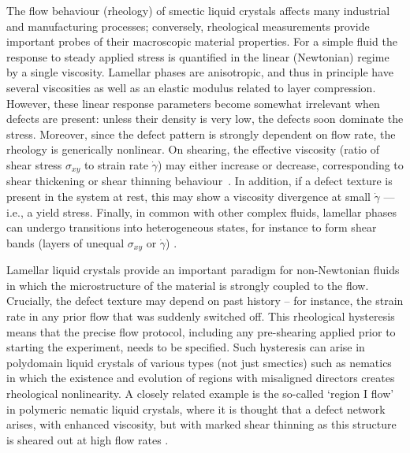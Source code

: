 \documentclass[8.5pt,twoside,twocolumn]{article}
\begin{document}
The flow behaviour (rheology) of smectic liquid crystals affects many industrial and manufacturing processes; conversely, rheological measurements provide important probes of their macroscopic material properties.
For a simple fluid the response to steady applied stress is quantified in the linear (Newtonian) regime by a single viscosity. Lamellar phases are anisotropic, and thus in principle have several viscosities as well as an elastic modulus related to layer compression. However, these linear response parameters become somewhat irrelevant when defects are present: unless their density is very low, the defects soon dominate the stress. Moreover, since the defect pattern is strongly dependent on flow rate, the rheology is generically nonlinear. On shearing, the effective viscosity (ratio of shear stress $\sigma_{xy}$  to strain rate $\dot\gamma$) may either increase or decrease, corresponding
to shear thickening or shear thinning behaviour~\cite{Larson}. In addition, if a defect texture is present in the system at rest, this may show a viscosity divergence at small $\dot \gamma$ --- i.e., a yield stress.
Finally, in common with other complex fluids, lamellar phases can undergo transitions into heterogeneous states, for instance to form shear bands (layers of unequal $\sigma_{xy}$ or $\dot\gamma$) \cite{Olmsted08}. 

Lamellar liquid crystals provide an important paradigm for non-Newtonian fluids in which the microstructure of the material is strongly coupled to the flow. Crucially, the defect texture may depend on past history -- for instance, the strain rate in any prior flow that was suddenly switched off. This rheological hysteresis means that the precise flow protocol, including any pre-shearing applied prior to starting the experiment, needs to be specified. Such hysteresis can arise in polydomain liquid crystals of various types (not just smectics) such as nematics in which the existence and evolution of regions with misaligned directors creates rheological nonlinearity. A closely related example is the so-called `region I flow' in polymeric nematic liquid crystals, where it is thought that a defect network arises, with enhanced viscosity, but with
marked shear thinning as this structure is sheared out at high flow rates \cite{Larson}. 
\end{document}
